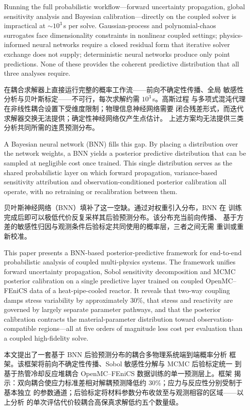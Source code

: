 \documentclass[11pt,a4paper]{article}
\begin{document}
Running the full probabilistic workflow---forward uncertainty
propagation, global sensitivity analysis and Bayesian
calibration---directly on the coupled solver is impractical at
${\sim}10^{3}$\,s per solve. Gaussian-process and polynomial-chaos
surrogates face dimensionality constraints in nonlinear coupled settings;
physics-informed neural networks require a closed residual form that
iterative solver exchange does not supply; deterministic neural networks
produce only point predictions. None of these provides the coherent
predictive distribution that all three analyses require.

在耦合求解器上直接运行完整的概率工作流——前向不确定性传播、全局
敏感性分析与贝叶斯标定——不可行，每次求解约需 $10^{3}$\,s。高斯过程
与多项式混沌代理在非线性耦合设置下受维度限制；物理信息神经网络需要
闭合残差形式，而迭代求解器交换无法提供；确定性神经网络仅产生点估计。
上述方案均无法提供三类分析共同所需的连贯预测分布。

A Bayesian neural network (BNN) fills this gap. By placing a
distribution over the network weights, a BNN yields a posterior
predictive distribution that can be sampled at negligible cost once
trained. This single distribution serves as the shared probabilistic
layer on which forward propagation, variance-based sensitivity
attribution and observation-conditioned posterior calibration all
operate, with no retraining or recalibration between them.

贝叶斯神经网络（BNN）填补了这一空缺。通过对权重引入分布，BNN 在
训练完成后即可以极低代价反复采样其后验预测分布。该分布充当前向传播、
基于方差的敏感性归因与观测条件后验标定共同使用的概率层，三者之间无需
重训或重新校准。

This paper presents a BNN-based posterior-predictive framework for
end-to-end probabilistic analysis of coupled multi-physics systems. The
framework unifies forward uncertainty propagation, Sobol sensitivity
decomposition and MCMC posterior calibration on a single predictive
layer trained on coupled OpenMC--FEniCS data of a heat-pipe-cooled
reactor. It reveals that two-way coupling damps stress variability by
approximately 30\%, that stress and reactivity are governed by largely
separate parameter pathways, and that the posterior calibration contracts
the material-parameter distribution toward observation-compatible
regions---all at five orders of magnitude less cost per evaluation
than a coupled high-fidelity solve.

本文提出了一套基于 BNN 后验预测分布的耦合多物理系统端到端概率分析
框架。该框架将前向不确定性传播、Sobol 敏感性分解与 MCMC 后验标定统一
到基于热管冷却反应堆耦合 OpenMC--FEniCS 数据训练的单一预测层上。框架
揭示：双向耦合使应力标准差相对解耦预测降低约 30\%；应力与反应性分别受制于基本独立
的参数通道；后验标定将材料参数分布收敛至与观测相容的区域——以上分析
的单次评估代价较耦合高保真求解低约五个数量级。
\end{document}
